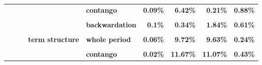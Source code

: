 \documentclass[
  authoryear,
  preprint,
  3p]{elsarticle}
\begin{document}
\begin{landscape}
\begin{longtable}[t]{>{}l>{}l>{}l>{}l>{}l>{}r>{}r>{}r>{}r}
\addlinespace
\textbf{} & \textbf{} & \textbf{} & \textbf{} & \textbf{contango} & \textcolor[HTML]{4285f4}{\textbf{0.09\%}} & \textcolor[HTML]{4285f4}{\textbf{6.42\%}} & \textcolor[HTML]{4285f4}{\textbf{0.21\%}} & \textcolor[HTML]{4285f4}{\textbf{0.88\%}}\\
\textbf{\cellcolor{gray!10}{}} & \textbf{\cellcolor{gray!10}{}} & \textbf{\cellcolor{gray!10}{}} & \textbf{\cellcolor{gray!10}{open interest}} & \textbf{\cellcolor{gray!10}{whole period}} & \textcolor[HTML]{4285f4}{\textbf{\cellcolor{gray!10}{0.18\%}}} & \textcolor[HTML]{4285f4}{\textbf{\cellcolor{gray!10}{1.01\%}}} & \textcolor[HTML]{4285f4}{\textbf{\cellcolor{gray!10}{2.78\%}}} & \textcolor[HTML]{4285f4}{\textbf{\cellcolor{gray!10}{0.46\%}}}\\
\textbf{} & \textbf{} & \textbf{} & \textbf{} & \textbf{backwardation} & \textcolor[HTML]{4285f4}{\textbf{0.1\%}} & \textcolor[HTML]{4285f4}{\textbf{0.34\%}} & \textcolor[HTML]{4285f4}{\textbf{1.84\%}} & \textcolor[HTML]{4285f4}{\textbf{0.61\%}}\\
\textbf{\cellcolor{gray!10}{}} & \textbf{\cellcolor{gray!10}{}} & \textbf{\cellcolor{gray!10}{}} & \textbf{\cellcolor{gray!10}{}} & \textbf{\cellcolor{gray!10}{contango}} & \textcolor[HTML]{4285f4}{\textbf{\cellcolor{gray!10}{0.24\%}}} & \textcolor[HTML]{4285f4}{\textbf{\cellcolor{gray!10}{1.82\%}}} & \textcolor[HTML]{4285f4}{\textbf{\cellcolor{gray!10}{3.42\%}}} & \textcolor[HTML]{4285f4}{\textbf{\cellcolor{gray!10}{0.37\%}}}\\
\textbf{} & \textbf{} & \textbf{} & \textbf{term structure} & \textbf{whole period} & \textcolor[HTML]{4285f4}{\textbf{0.06\%}} & \textcolor[HTML]{4285f4}{\textbf{9.72\%}} & \textcolor[HTML]{4285f4}{\textbf{9.63\%}} & \textcolor[HTML]{4285f4}{\textbf{0.24\%}}\\
\addlinespace
\textbf{\cellcolor{gray!10}{}} & \textbf{\cellcolor{gray!10}{}} & \textbf{\cellcolor{gray!10}{}} & \textbf{\cellcolor{gray!10}{}} & \textbf{\cellcolor{gray!10}{backwardation}} & \textcolor[HTML]{4285f4}{\textbf{\cellcolor{gray!10}{0.37\%}}} & \textcolor[HTML]{4285f4}{\textbf{\cellcolor{gray!10}{7.74\%}}} & \textcolor[HTML]{4285f4}{\textbf{\cellcolor{gray!10}{7.44\%}}} & \textcolor[HTML]{4285f4}{\textbf{\cellcolor{gray!10}{0.12\%}}}\\
\textbf{} & \textbf{} & \textbf{} & \textbf{} & \textbf{contango} & \textcolor[HTML]{4285f4}{\textbf{0.02\%}} & \textcolor[HTML]{4285f4}{\textbf{11.67\%}} & \textcolor[HTML]{4285f4}{\textbf{11.07\%}} & \textcolor[HTML]{4285f4}{\textbf{0.43\%}}\\

\end{longtable}
\end{landscape}
\end{document}

